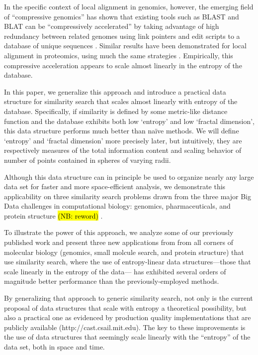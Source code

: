 \documentclass{amsbook}
\theoremstyle{definition}
\theoremstyle{remark}
\numberwithin{equation}{section}
\begin{document}
In the specific context of local alignment in genomics, however, the emerging field of ``compressive genomics'' has shown that existing tools such as BLAST and BLAT can be ``compressively accelerated'' by taking advantage of high redundancy between related genomes using link pointers and edit scripts to a database of unique sequences \cite{loh2012compressive}.
Similar results have been demonstrated for local alignment in proteomics, using much the same strategies \cite{daniels2013compressive}.
Empirically, this compressive acceleration appears to scale almost linearly in the entropy of the database.

In this paper, we generalize this approach and introduce a practical data structure for similarity search that scales almost linearly with entropy of the database.
Specifically, if similarity is defined by some metric-like distance function and the database exhibits both low `entropy' and low `fractal dimension', this data structure performs much better than na\"ive methods.
We will define `entropy' and `fractal dimension' more precisely later, but intuitively, they are respectively measures of the total information content and scaling behavior of number of points contained in spheres of varying radii.

Although this data structure can in principle be used to organize nearly any large data set for faster and more space-efficient analysis,
we demonstrate this applicability on three similarity search problems drawn from the three major Big Data challenges in computational biology: genomics, pharmaceuticals, and protein structure \hl{(NB: reword)} \cite{marx2013biology}.

To illustrate the power of this approach, we analyze some of our previously published work and present three new applications from from all corners of molecular biology (genomics, small molcule search, and protein structure) that use similarity search, where the use of entropy-linear data structures—those that scale linearly in the entropy of the data— has exhibited several orders of magnitude better performance than the previously-employed methods.


By generalizing that approach to generic similarity search, not only is the current proposal of data structures that scale with entropy a theoretical possibility, but also a practical one as evidenced by production quality implementations that are publicly available (http://cast.csail.mit.edu).
The key to these improvements is the use of data structures that seemingly scale linearly with the “entropy” of the data set, both in space and time.
\end{document}
